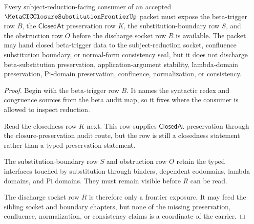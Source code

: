 \begin{theorem}
\label{thm:metacic-closure-substitution-frontier-subject-reduction-boundary}
Every subject-reduction-facing consumer of an accepted $\MetaCICClosureSubstitutionFrontierUp$ packet must expose the beta-trigger row $B$, the $\mathsf{ClosedAt}$ preservation row $K$, the substitution-boundary row $S$, and the obstruction row $O$ before the discharge socket row $R$ is available. The packet may hand closed beta-trigger data to the subject-reduction socket, confluence substitution boundary, or normal-form consistency seal, but it does not discharge beta-substitution preservation, application-argument stability, lambda-domain preservation, Pi-domain preservation, confluence, normalization, or consistency.
\end{theorem}
\begin{proof}
Begin with the beta-trigger row $B$. It names the syntactic redex and congruence sources from the beta audit map, so it fixes where the consumer is allowed to inspect reduction.

Read the closedness row $K$ next. This row supplies $\mathsf{ClosedAt}$ preservation through the closure-preservation audit route, but the row is still a closedness statement rather than a typed preservation statement.

The substitution-boundary row $S$ and obstruction row $O$ retain the typed interfaces touched by substitution through binders, dependent codomains, lambda domains, and Pi domains. They must remain visible before $R$ can be read.

The discharge socket row $R$ is therefore only a frontier exposure. It may feed the sibling socket and boundary chapters, but none of the missing preservation, confluence, normalization, or consistency claims is a coordinate of the carrier.
\end{proof}



